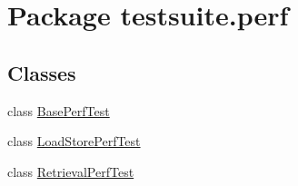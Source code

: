 \hypertarget{namespacetestsuite_1_1perf}{}\section{Package testsuite.\+perf}
\label{namespacetestsuite_1_1perf}
\subsection*{Classes}
\begin{DoxyCompactItemize}
\item 
class \mbox{\hyperlink{classtestsuite_1_1perf_1_1_base_perf_test}{Base\+Perf\+Test}}
\item 
class \mbox{\hyperlink{classtestsuite_1_1perf_1_1_load_store_perf_test}{Load\+Store\+Perf\+Test}}
\item 
class \mbox{\hyperlink{classtestsuite_1_1perf_1_1_retrieval_perf_test}{Retrieval\+Perf\+Test}}
\end{DoxyCompactItemize}
